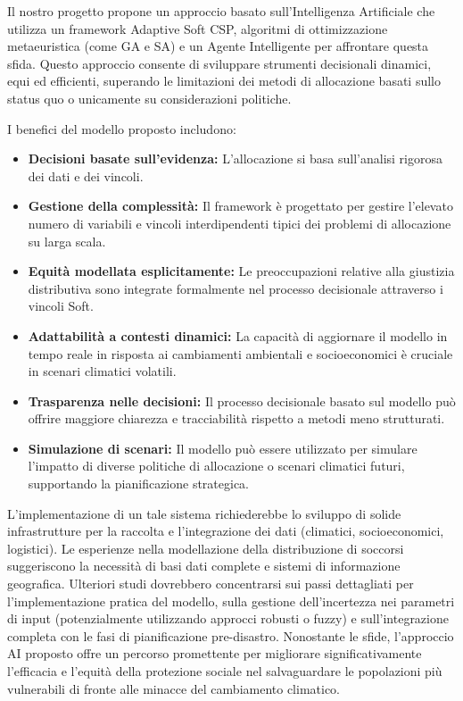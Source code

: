 \documentclass{article}
\begin{document}
Il nostro progetto propone un approccio basato sull'Intelligenza Artificiale che utilizza un framework Adaptive Soft CSP, algoritmi di ottimizzazione metaeuristica (come GA e SA) e un Agente Intelligente per affrontare questa sfida. Questo approccio consente di sviluppare strumenti decisionali dinamici, equi ed efficienti, superando le limitazioni dei metodi di allocazione basati sullo status quo o unicamente su considerazioni politiche.

I benefici del modello proposto includono:
\begin{itemize}
    \item \textbf{Decisioni basate sull'evidenza:} L'allocazione si basa sull'analisi rigorosa dei dati e dei vincoli.
    \item \textbf{Gestione della complessità:} Il framework è progettato per gestire l'elevato numero di variabili e vincoli interdipendenti tipici dei problemi di allocazione su larga scala.
    \item \textbf{Equità modellata esplicitamente:} Le preoccupazioni relative alla giustizia distributiva sono integrate formalmente nel processo decisionale attraverso i vincoli Soft.
    \item \textbf{Adattabilità a contesti dinamici:} La capacità di aggiornare il modello in tempo reale in risposta ai cambiamenti ambientali e socioeconomici è cruciale in scenari climatici volatili.
    \item \textbf{Trasparenza nelle decisioni:} Il processo decisionale basato sul modello può offrire maggiore chiarezza e tracciabilità rispetto a metodi meno strutturati.
    \item \textbf{Simulazione di scenari:} Il modello può essere utilizzato per simulare l'impatto di diverse politiche di allocazione o scenari climatici futuri, supportando la pianificazione strategica.
\end{itemize}

L'implementazione di un tale sistema richiederebbe lo sviluppo di solide infrastrutture per la raccolta e l'integrazione dei dati (climatici, socioeconomici, logistici). Le esperienze nella modellazione della distribuzione di soccorsi suggeriscono la necessità di basi dati complete e sistemi di informazione geografica. Ulteriori studi dovrebbero concentrarsi sui passi dettagliati per l'implementazione pratica del modello, sulla gestione dell'incertezza nei parametri di input (potenzialmente utilizzando approcci robusti o fuzzy) e sull'integrazione completa con le fasi di pianificazione pre-disastro. Nonostante le sfide, l'approccio AI proposto offre un percorso promettente per migliorare significativamente l'efficacia e l'equità della protezione sociale nel salvaguardare le popolazioni più vulnerabili di fronte alle minacce del cambiamento climatico.
\end{document}
